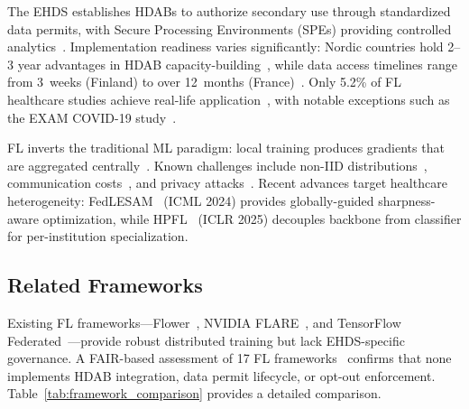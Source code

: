 \documentclass[conference]{IEEEtran}
\begin{document}
The EHDS establishes HDABs to authorize secondary use through standardized data permits, with Secure Processing Environments (SPEs) providing controlled analytics~\cite{svingel2025hdab}. Implementation readiness varies significantly: Nordic countries hold 2--3 year advantages in HDAB capacity-building~\cite{tehdas2024ready}, while data access timelines range from 3~weeks (Finland) to over 12~months (France)~\cite{forster2025journeys}. Only 5.2\% of FL healthcare studies achieve real-life application~\cite{teo2024systematic}, with notable exceptions such as the EXAM COVID-19 study~\cite{dayan2021federated}.

FL inverts the traditional ML paradigm: local training produces gradients that are aggregated centrally~\cite{mcmahan2017communication}. Known challenges include non-IID distributions~\cite{li2020federated}, communication costs~\cite{bonawitz2019scale}, and privacy attacks~\cite{zhu2019deep, shokri2017membership}. Recent advances target healthcare heterogeneity: FedLESAM~\cite{qu2024fedlesam} (ICML 2024) provides globally-guided sharpness-aware optimization, while HPFL~\cite{chen2025hpfl} (ICLR 2025) decouples backbone from classifier for per-institution specialization.

\subsection{Related Frameworks}

Existing FL frameworks---Flower~\cite{beutel2023flower}, NVIDIA FLARE~\cite{nvflare2023}, and TensorFlow Federated~\cite{tff2019}---provide robust distributed training but lack EHDS-specific governance. A FAIR-based assessment of 17 FL frameworks~\cite{chaverodiez2026fair} confirms that none implements HDAB integration, data permit lifecycle, or opt-out enforcement. Table~\ref{tab:framework_comparison} provides a detailed comparison.
\end{document}
